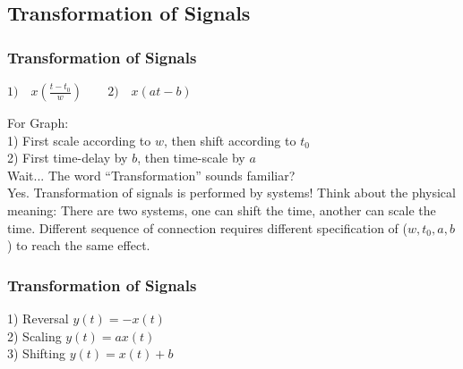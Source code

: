 \documentclass{beamer}
\begin{document}
\subsection{Transformation of Signals}

\begin{frame}
\frametitle{Transformation of Signals}
\begin{theorem}
$1) \quad x(\frac{t-t_0}{w}) \qquad 2) \quad x(at-b)$
\end{theorem}
For Graph: \\
1) First scale according to $w$, then shift according to $t_0$ \\
2) First time-delay by $b$, then time-scale by $a$ 
\newline \\
Wait... The word ``Transformation'' sounds familiar? \\
Yes. Transformation of signals is performed by systems! 
\newline 
\newline
Think about the physical meaning: 
There are two systems, one can shift the time, another can scale the time. Different sequence of connection requires different specification of ($w, t_0, a, b$) to reach the same effect. 
\end{frame}

\begin{frame}
    \frametitle{Transformation of Signals}
    \begin{theorem}
    1) Reversal $y(t) = -x(t) $ \\
    2) Scaling $y(t) = ax(t)$ \\
    3) Shifting $y(t) = x(t) + b $\\
    \end{theorem}  
\end{frame}
    
\end{document}

